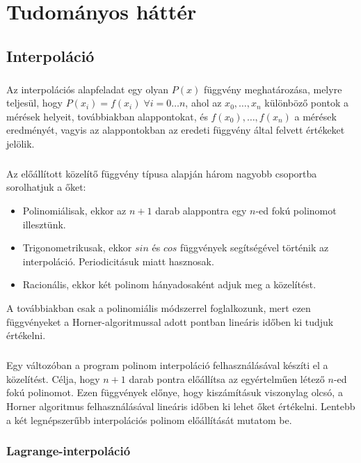 \documentclass[12pt]{report}
\begin{document}
\chapter{Tudományos háttér}

\section{Interpoláció}
\paragraph{}
Az interpolációs alapfeladat egy olyan $P(x)$ függvény meghatározása, melyre teljesül, hogy $P(x_i)=f(x_i) \; \forall i = 0 \dots n$, ahol az $x_0, \dots, x_n$ különböző pontok a mérések helyeit, továbbiakban alappontokat, és $f(x_0), \dots, f(x_n)$ a mérések eredményét, vagyis az alappontokban az eredeti függvény által felvett értékeket jelölik.
\paragraph{}
Az előállított közelítő függvény típusa alapján három nagyobb csoportba sorolhatjuk a őket:
\begin{itemize}
\item Polinomiálisak, ekkor az $n+1$ darab alappontra egy $n$-ed fokú polinomot illesztünk.
\item Trigonometrikusak, ekkor $sin$ és $cos$ függvények segítségével történik az interpoláció. Periodicitásuk miatt hasznosak.
\item Racionális, ekkor két polinom hányadosaként adjuk meg a közelítést.
\end{itemize}
A továbbiakban csak a polinomiális módszerrel foglalkozunk, mert ezen függvényeket a Horner-algoritmussal adott pontban lineáris időben ki tudjuk értékelni.
\paragraph{}
Egy változóban a program polinom interpoláció felhasználásával készíti el a közelítést. Célja, hogy $n+1$ darab pontra előállítsa az egyértelműen létező $n$-ed fokú polinomot. Ezen függvények előnye, hogy kiszámításuk viszonylag olcsó, a Horner algoritmus felhasználásával lineáris időben ki lehet őket értékelni. Lentebb a két legnépszerűbb interpolációs polinom előállítását mutatom be.

\subsection{Lagrange-interpoláció}
\end{document}
